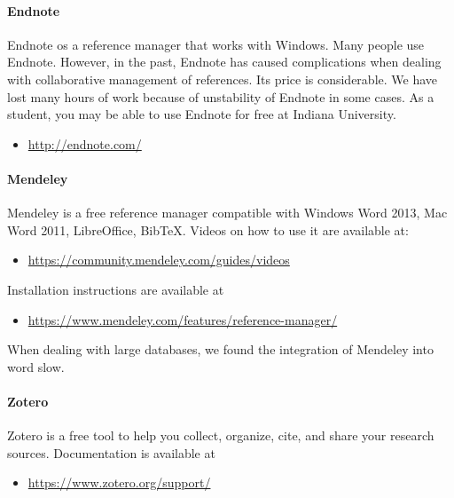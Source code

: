 \paragraph{Endnote}\label{endnote}

Endnote os a reference manager that works with Windows. Many people use
Endnote. However, in the past, Endnote has caused complications when
dealing with collaborative management of references. Its price is
considerable. We have lost many hours of work because of unstability of
Endnote in some cases. As a student, you may be able to use Endnote for
free at Indiana University.

\begin{itemize}
\tightlist
\item
  \url{http://endnote.com/}
\end{itemize}

\paragraph{Mendeley}\label{mendeley}

Mendeley is a free reference manager compatible with Windows Word 2013,
Mac Word 2011, LibreOffice, BibTeX. Videos on how to use it are
available at:

\begin{itemize}
\tightlist
\item
  \url{https://community.mendeley.com/guides/videos}
\end{itemize}

Installation instructions are available at

\begin{itemize}
\tightlist
\item
  \url{https://www.mendeley.com/features/reference-manager/}
\end{itemize}

When dealing with large databases, we found the integration of Mendeley
into word slow.

\paragraph{Zotero}\label{zotero}

Zotero is a free tool to help you collect, organize, cite, and share
your research sources. Documentation is available at

\begin{itemize}
\tightlist
\item
  \url{https://www.zotero.org/support/}
\end{itemize}

